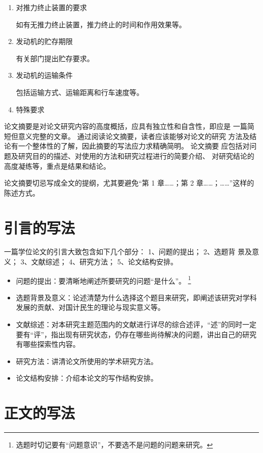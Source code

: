 \begin{enumerate}[leftmargin=2em]
  \item 对推力终止装置的要求
  
  如有无推力终止装置，推力终止的时间和作用效果等。

  \item 发动机的贮存期限
  
  有关部门提出贮存要求。

  \item 发动机的运输条件
  
  包括运输方式、运输距离和行车速度等。

  \item 特殊要求
  

  
\end{enumerate}

论文摘要是对论文研究内容的高度概括，应具有独立性和自含性，即应是 一篇简短但意义完整的文章。
通过阅读论文摘要，读者应该能够对论文的研究 方法及结论有一个整体性的了解，因此摘要的写法应力求精确简明。
论文摘要 应包括对问题及研究目的的描述、对使用的方法和研究过程进行的简要介绍、 对研究结论的高度凝练等，重点是结果和结论。

论文摘要切忌写成全文的提纲，尤其要避免“第 1 章……；第 2 章……；……”这样的陈述方式。



\section{引言的写法}

一篇学位论文的引言大致包含如下几个部分：
1、问题的提出；
2、选题背 景及意义；
3、文献综述；
4、研究方法；
5、论文结构安排。
\begin{itemize}
  \item 问题的提出：要清晰地阐述所要研究的问题“是什么”。
    \footnote{选题时切记要有“问题意识”，不要选不是问题的问题来研究。}
  \item 选题背景及意义：论述清楚为什么选择这个题目来研究，即阐述该研究对学科发展的贡献、对国计民生的理论与现实意义等。
  \item 文献综述：对本研究主题范围内的文献进行详尽的综合述评，“述”的同时一定要有“评”，指出现有研究状态，仍存在哪些尚待解决的问题，讲出自己的研究有哪些探索性内容。
  \item 研究方法：讲清论文所使用的学术研究方法。
  \item 论文结构安排：介绍本论文的写作结构安排。
\end{itemize}



\section{正文的写法}

